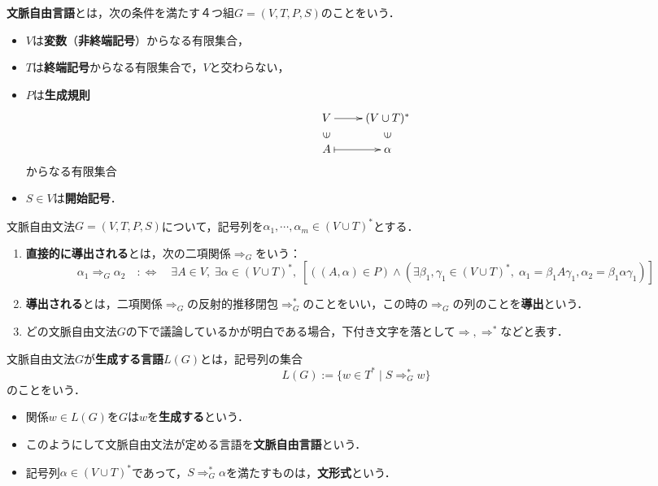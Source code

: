 \documentclass[uplatex, dvipdfmx]{jsreport}
\begin{document}
\begin{definition}
    \textbf{文脈自由言語}とは，次の条件を満たす４つ組$G=(V,T,P,S)$のことをいう．
    \begin{itemize}
        \item $V$は\textbf{変数}（\textbf{非終端記号}）からなる有限集合，
        \item $T$は\textbf{終端記号}からなる有限集合で，$V$と交わらない，
        \item $P$は\textbf{生成規則}
        \[\xymatrix@R-2pc{
            V\ar[r]&(V\cup T)^*\\
            \rotatebox[origin=c]{90}{$\in$}&\rotatebox[origin=c]{90}{$\in$}\\
            A\ar@{|->}[r]&\alpha
        }\]
        からなる有限集合
        \item $S\in V$は\textbf{開始記号}．
    \end{itemize}
\end{definition}

\begin{definition}[derivation]
    文脈自由文法$G=(V,T,P,S)$について，記号列を$\alpha_1,\cdots,\alpha_m\in(V\cup T)^*$とする．
    \begin{enumerate}
        \item \textbf{直接的に導出される}とは，次の二項関係$\Rightarrow_G$をいう：
        \[\alpha_1\Rightarrow_G\alpha_2\quad:\Leftrightarrow\quad\exists A\in V,\;\exists\alpha\in(V\cup T)^*,\;[((A,\alpha)\in P)\land (\exists \beta_1,\gamma_1\in(V\cup T)^*,\;\alpha_1=\beta_1A\gamma_1,\alpha_2=\beta_1\alpha\gamma_1)]\]
        \item \textbf{導出される}とは，二項関係$\Rightarrow_G$の反射的推移閉包$\Rightarrow^*_G$のことをいい，この時の$\Rightarrow_G$の列のことを\textbf{導出}という．
        \item どの文脈自由文法$G$の下で議論しているかが明白である場合，下付き文字を落として$\Rightarrow,\Rightarrow^*$などと表す．
    \end{enumerate}
\end{definition}

\begin{definition}
    文脈自由文法$G$が\textbf{生成する言語}$L(G)$とは，記号列の集合
    \[L(G):=\{w\in T^*\mid S\Rightarrow^*_Gw\}\]
    のことをいう．
    \begin{itemize}
        \item 関係$w\in L(G)$を$G$は$w$を\textbf{生成する}という．
        \item このようにして文脈自由文法が定める言語を\textbf{文脈自由言語}という．
        \item 記号列$\alpha\in(V\cup T)^*$であって，$S\Rightarrow^*_G\alpha$を満たすものは，\textbf{文形式}という．
    \end{itemize}
\end{definition}
\end{document}
